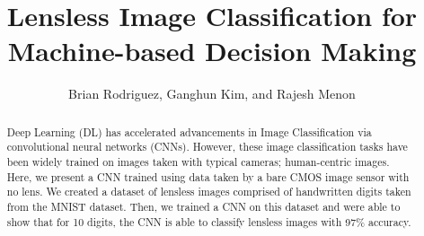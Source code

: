 \documentclass{osa-article}
\begin{document}
\title{Lensless Image Classification for Machine-based Decision Making}

\author{Brian Rodriguez, Ganghun Kim, and Rajesh Menon}

\address{Department of Electrical and Computer Engineering, University of Utah, Salt Lake City, UT 84112}
\address{Currently with Apple Inc, Cupertino CA}


\begin{abstract}
Deep Learning (DL) has accelerated advancements in Image Classification via convolutional neural networks (CNNs). However, these image classification tasks have been widely trained on images taken with typical cameras; human-centric images. Here, we present a CNN trained using data taken by a bare CMOS image sensor with no lens. We created a dataset of lensless images comprised of handwritten digits taken from the MNIST dataset. Then, we trained a CNN on this dataset and were able to show that for 10 digits, the CNN is able to classify lensless images with 97\% accuracy.
\end{abstract}
%
\end{document}
